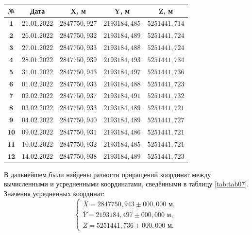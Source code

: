 \begin{table} [htbp]
	\centering\small
	\label{tab:tab06}{%
		\begin{tabular}{|c|c|c|c|c|}
			\hline
			\textbf{№} & \textbf{Дата} & \textbf{X, м} & \textbf{Y, м} & \textbf{Z, м} \\
			\hline
			\textbf{ $\mathbf{1}$} & $21.01.2022$ & $2847750,927$ & $2193184,485$ & $5251441,714$ \\
			\hline
			\textbf{ $\mathbf{2}$} & $26.01.2022$ & $2847750,932$ & $2193184,489$ & $5251441,724$ \\
			\hline
			\textbf{ $\mathbf{3}$} & $27.01.2022$ & $2847750,933$ & $2193184,488$ & $5251441,724$ \\
			\hline
			\textbf{ $\mathbf{4}$} & $28.01.2022$ & $2847750,939$ & $2193184,493$ & $5251441,734$ \\
			\hline
			\textbf{ $\mathbf{5}$} & $31.01.2022$ & $2847750,943$ & $2193184,497$ & $5251441,736$ \\
			\hline
			\textbf{ $\mathbf{6}$} & $01.02.2022$ & $2847750,933$ & $2193184,488$ & $5251441,723$ \\
			\hline
			\textbf{ $\mathbf{7}$} & $02.02.2022$ & $2847750,937$ & $2193184,491$ & $5251441,732$ \\
			\hline
			\textbf{ $\mathbf{8}$} & $03.02.2022$ & $2847750,933$ & $2193184,489$ & $5251441,721$ \\
			\hline
			\textbf{ $\mathbf{9}$} & $04.02.2022$ & $2847750,940$ & $2193184,489$ & $5251441,727$ \\
			\hline
			\textbf{$\mathbf{10}$} & $09.02.2022$ & $2847750,931$ & $2193184,486$ & $5251441,721$ \\
			\hline
			\textbf{$\mathbf{11}$} & $10.02.2022$ & $2847750,932$ & $2193184,485$ & $5251441,721$ \\
			\hline
			\textbf{$\mathbf{12}$} & $14.02.2022$ & $2847750,938$ & $2193184,489$ & $5251441,723$ \\
			\hline
		\end{tabular}
	}
\end{table}

В дальнейшем были найдены разности приращений координат между вычисленными и усредненными координатами, сведёнными в таблицу \cref{tab:tab07}. 
Значения усредненных координат: 
$$
	\left\{
	\begin{matrix}
		\overline{X} = 2847750,943 \pm 000,000 \text{ м}, \\
		\overline{Y} = 2193184,497 \pm 000,000 \text{ м}, \\
		\overline{Z} = 5251441,736 \pm 000,000 \text{ м.}
	\end{matrix}
	\right.
$$

